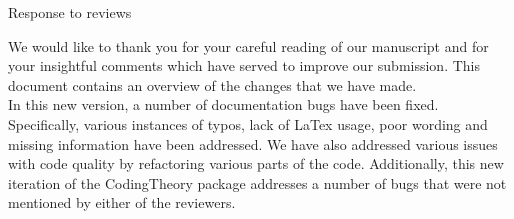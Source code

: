 \documentclass[12pt]{amsart}
\theoremstyle{plain}
\begin{document}
\begin{center}
Response to reviews
\end{center}
We would like to thank you for your careful reading of our manuscript and for your insightful comments which have served to improve our submission. This document contains an overview of the changes that we have made.
\\

In this new version, a number of documentation bugs have been fixed. Specifically, various instances of typos, lack of LaTex usage, poor wording and missing information have been addressed. We have also addressed various issues with code quality by refactoring various parts of the code. Additionally, this new iteration of the {\ttfamily CodingTheory} package addresses a number of bugs that were not mentioned by either of the reviewers. 
\\
\end{document}

